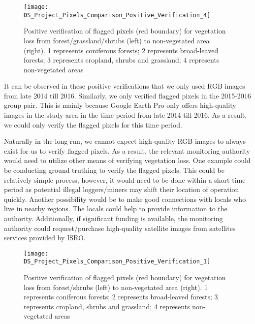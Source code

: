 \begin{figure}[H]
	\centering
	\texttt{[image: DS\_Project\_Pixels\_Comparison\_Positive\_Verification\_4]}
	\caption[Positive verification of flagged pixels (red boundary) for vegetation loss from forest/grassland/shrubs (left) to non-vegetated area (right)]{Positive verification of flagged pixels (red boundary) for vegetation loss from forest/grassland/shrubs (left) to non-vegetated area (right). 1 represents coniferous forests; 2 represents broad-leaved forests; 3 represents cropland, shrubs and grassland; 4 represents non-vegetated areas}
	\label{fig28}
\end{figure}

\justify
It can be observed in these positive verifications that we only used RGB images from late 2014 till 2016. Similarly, we only verified flagged pixels in the 2015-2016 group pair. This is mainly because Google Earth Pro only offers high-quality images in the study area in the time period from late 2014 till 2016. As a result, we could only verify the flagged pixels for this time period.

\justify
Naturally in the long-run, we cannot expect high-quality RGB images to always exist for us to verify flagged pixels. As a result, the relevant monitoring authority would need to utilize other means of verifying vegetation loss. One example could be conducting ground truthing to verify the flagged pixels. This could be relatively simple process, however, it would need to be done within a short-time period as potential illegal loggers/miners may shift their location of operation quickly. Another possibility would be to make good connections with locals who live in nearby regions. The locals could help to provide information to the authority. Additionally, if significant funding is available, the monitoring authority could request/purchase high-quality satellite images from satellites services provided by ISRO.

\begin{figure}[H]
	\centering
	\texttt{[image: DS\_Project\_Pixels\_Comparison\_Positive\_Verification\_1]}
	\caption[Positive verification of flagged pixels (red boundary) for vegetation loss from forest/shrubs (left) to non-vegetated area (right)]{Positive verification of flagged pixels (red boundary) for vegetation loss from forest/shrubs (left) to non-vegetated area (right). 1 represents coniferous forests; 2 represents broad-leaved forests; 3 represents cropland, shrubs and grassland; 4 represents non-vegetated areas}
	\label{fig29}
\end{figure}

